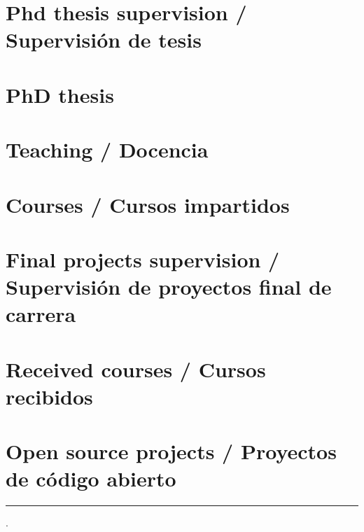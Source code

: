 \documentclass{article}
\begin{document}
\renewcommand{\refname}{}
\section{Phd thesis supervision / Supervisión de tesis}


\section{PhD thesis}


\section{Teaching / Docencia}


\renewcommand{\refname}{}
\section{Courses / Cursos impartidos}


\renewcommand{\refname}{}
\section{Final projects supervision / Supervisión de proyectos final de carrera}


\renewcommand{\refname}{}
\section{Received courses / Cursos recibidos}


\renewcommand{\refname}{}
\section{Open source projects / Proyectos de código abierto}


\hrule
\currenttime.
\end{document}
